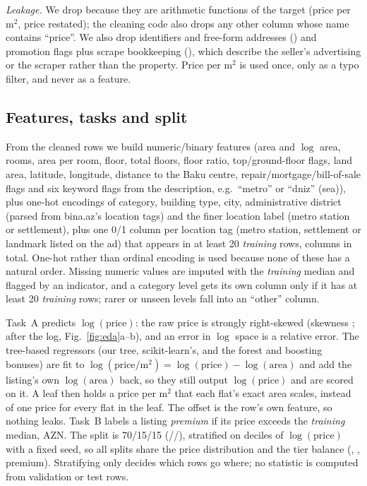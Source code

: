 \documentclass[10pt,twocolumn,a4paper]{article}
\newcommand{\gen}[1]{}
\newcommand{\fit}[1]{\resizebox{\ifdim\width>\linewidth\linewidth\else\width\fi}{!}{#1}}
\newcommand{\schwa}{\raisebox{0.13ex}{\rotatebox[origin=c]{180}{e}}}  %
\begin{document}
\begin{table}[t]
  \centering
  \caption{Cleaning steps and rows remaining.}
  \label{tab:cleaning}
  \fit{\gen{tab_cleaning}}
\end{table}

\emph{Leakage.} We drop \textbf{\LeakageCols} because they are
arithmetic functions of the target (price per m$^2$, price restated);
the cleaning code also drops any other column whose name contains
``price''. We also drop identifiers and free-form addresses
(\IdentifierCols) and promotion flags plus scrape bookkeeping
(\MetaCols), which describe the seller's advertising or the scraper rather
than the property. Price per m$^2$
is used once, only as a typo filter, and never as a feature.

\subsection{Features, tasks and split}
From the cleaned rows we build \NNumericFeatures{} numeric/binary features
(area and $\log$ area, rooms, area per room, floor, total floors, floor
ratio, top/ground-floor flags, land area, latitude, longitude, distance
to the Baku centre, repair/mortgage/bill-of-sale flags and six keyword
flags from the description, e.g.\ ``metro'' or ``d\schwa{}niz'' (sea)), plus
one-hot encodings of category, building type, city, administrative district
(parsed from bina.az's location tags) and the finer location label (metro
station or settlement), plus one 0/1 column per location tag (metro
station, settlement or landmark listed on the ad) that appears in at least
20 \emph{training} rows, \NFeatures{} columns in total. One-hot rather than ordinal encoding is
used because none of these has a natural order. Missing numeric values are
imputed with the \emph{training} median and flagged by an indicator, and
a category level gets its own column only if it has at least 20
\emph{training} rows; rarer or unseen levels fall into an ``other'' column.

Task~A predicts $\log(\text{price})$: the raw price is strongly
right-skewed (skewness \PriceSkew; \LogPriceSkew{} after the log,
Fig.~\ref{fig:eda}a--b), and an error in $\log$ space is a relative error.
The tree-based regressors (our tree, scikit-learn's, and the forest and
boosting bonuses) are fit to $\log(\text{price}/\text{m}^2)=\log(\text{price})-\log(\text{area})$
and add the listing's own $\log(\text{area})$ back, so they still output
$\log(\text{price})$ and are scored on it. A leaf then holds a price per
m$^2$ that each flat's exact area scales, instead of one price for every
flat in the leaf. The offset is the row's own feature, so nothing leaks.
Task~B labels a listing \emph{premium} if its price exceeds the
\emph{training} median, \TierThreshold{} AZN. The split is 70/15/15
(\NTrain/\NVal/\NTest), stratified on deciles of $\log(\text{price})$ with
a fixed seed, so all splits share the price distribution and the tier
balance (\PremiumTrain, \PremiumVal, \PremiumTest{} premium). Stratifying
only decides which rows go where; no statistic is computed from
validation or test rows.
\end{document}
